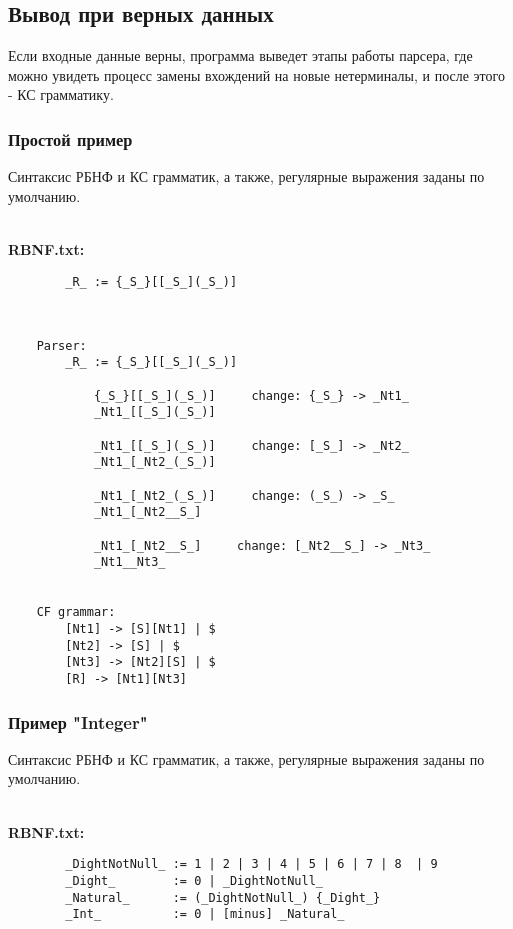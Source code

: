 \documentclass[12pt]{article}
\begin{document}
    \subsection{Вывод при верных данных}

    Если входные данные верны, программа выведет этапы работы парсера, где можно увидеть процесс замены вхождений на новые нетерминалы, и после этого - КС грамматику.

    \clearpage


    \subsubsection*{\large Простой пример}
    Синтаксис РБНФ и КС грамматик, а также, регулярные выражения заданы по умолчанию.

    \hfill \\
    {\bfseries RBNF.txt:}
    \begin{lstlisting}
        _R_ := {_S_}[[_S_](_S_)]
    \end{lstlisting}

    \hfill \\  %
    \begin{lstlisting}
    Parser:
        _R_ := {_S_}[[_S_](_S_)]

            {_S_}[[_S_](_S_)]     change: {_S_} -> _Nt1_
            _Nt1_[[_S_](_S_)]

            _Nt1_[[_S_](_S_)]     change: [_S_] -> _Nt2_
            _Nt1_[_Nt2_(_S_)]

            _Nt1_[_Nt2_(_S_)]     change: (_S_) -> _S_
            _Nt1_[_Nt2__S_]

            _Nt1_[_Nt2__S_]     change: [_Nt2__S_] -> _Nt3_
            _Nt1__Nt3_


    CF grammar:
        [Nt1] -> [S][Nt1] | $
        [Nt2] -> [S] | $
        [Nt3] -> [Nt2][S] | $
        [R] -> [Nt1][Nt3]
    \end{lstlisting}

    \clearpage


    \subsubsection*{\large Пример "Integer"}
    Синтаксис РБНФ и КС грамматик, а также, регулярные выражения заданы по умолчанию.

    \hfill \\
    {\bfseries RBNF.txt:}
    \begin{lstlisting}
        _DightNotNull_ := 1 | 2 | 3 | 4 | 5 | 6 | 7 | 8  | 9
        _Dight_        := 0 | _DightNotNull_
        _Natural_      := (_DightNotNull_) {_Dight_}
        _Int_          := 0 | [minus] _Natural_
    \end{lstlisting}
\end{document}
